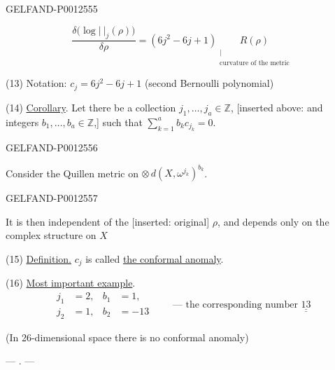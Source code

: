 \begin{GelfandAdjacentEvidence}{GELFAND-P001255}{5}

\begin{equation*}
\frac{\delta\bigl(\log\lvert\ \rvert_j(\rho)\bigr)}{\delta\rho}
=(6j^2-6j+1)\underset{\substack{\vert\\\text{curvature of the metric}}}{R(\rho)}
\end{equation*}

\noindent (13) Notation: $c_j=6j^2-6j+1$
\qquad (second Bernoulli polynomial)

\noindent (14) \underline{Corollary}.
Let there be a collection $j_1,\ldots,j_a\in\mathbb Z$,
[inserted above: and integers $b_1,\ldots,b_a\in\mathbb Z$,]
such that $\sum_{k=1}^{a}b_kc_{j_k}=0$.
\end{GelfandAdjacentEvidence}
\begin{GelfandAdjacentEvidence}{GELFAND-P001255}{6}


Consider the Quillen metric on $\otimes\,d(X,\omega^{j_k})^{b_k}$.
\end{GelfandAdjacentEvidence}
\begin{GelfandAdjacentEvidence}{GELFAND-P001255}{7}

It is then independent of the [inserted: original] $\rho$,
and depends only on the complex structure on $X$

\noindent (15) \underline{Definition.} $c_j$ is called \underline{the conformal anomaly}.

\noindent (16) \underline{Most important example}.
\begin{equation*}
\begin{aligned}
j_1&=2,&b_1&=1,\\
j_2&=1,&b_2&=-13
\end{aligned}
\qquad\text{— the corresponding number }\underline{\underline{13}}
\end{equation*}
\end{GelfandAdjacentEvidence}


(In 26-dimensional space there is no conformal anomaly)
\begin{center}— . —\end{center}


